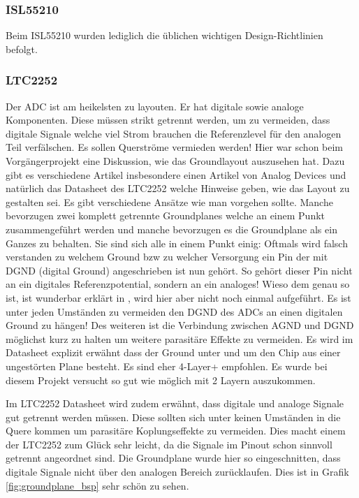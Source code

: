 \subsubsection*{ISL55210}
Beim ISL55210 wurden lediglich die üblichen wichtigen Design-Richtlinien befolgt. 

\subsubsection*{LTC2252}
Der ADC ist am heikelsten zu layouten. Er hat digitale sowie analoge Komponenten. Diese müssen strikt getrennt werden, um zu vermeiden, dass digitale Signale welche viel Strom brauchen die Referenzlevel für den analogen Teil verfälschen. Es sollen Querströme vermieden werden!
Hier war schon beim Vorgängerprojekt eine Diskussion, wie das Groundlayout auszusehen hat. Dazu gibt es verschiedene Artikel insbesondere einen Artikel von Analog Devices \cite{StayingWellGrounded2012} und natürlich das Datasheet des LTC2252\cite{LTC2252} welche Hinweise geben, wie das Layout zu gestalten sei. Es gibt verschiedene Ansätze wie man vorgehen sollte. Manche bevorzugen zwei komplett getrennte Groundplanes welche an einem Punkt zusammengeführt werden und manche bevorzugen es die Groundplane als ein Ganzes zu behalten. Sie sind sich alle in einem Punkt einig: Oftmals wird falsch verstanden zu welchem Ground bzw zu welcher Versorgung ein Pin der mit DGND (digital Ground) angeschrieben ist nun gehört. So gehört dieser Pin nicht an ein digitales Referenzpotential, sondern an ein analoges! Wieso dem genau so ist, ist wunderbar erklärt in \cite{StayingWellGrounded2012}, wird hier aber nicht noch einmal aufgeführt.
Es ist unter jeden Umständen zu vermeiden den DGND des ADCs an einen digitalen Ground zu hängen! Des weiteren ist die Verbindung zwischen AGND und DGND möglichst kurz zu halten um weitere parasitäre Effekte zu vermeiden.
Es wird im Datasheet explizit erwähnt dass der Ground unter und um den Chip aus einer ungestörten Plane besteht. Es sind eher 4-Layer+ empfohlen. Es wurde bei diesem Projekt versucht so gut wie möglich mit 2 Layern auszukommen.

Im LTC2252 Datasheet wird zudem erwähnt, dass digitale und analoge Signale gut getrennt werden müssen. Diese sollten sich unter keinen Umständen in die Quere kommen um parasitäre Koplungseffekte zu vermeiden. Dies macht einem der LTC2252 zum Glück sehr leicht, da die Signale im Pinout schon sinnvoll getrennt angeordnet sind.
Die Groundplane wurde hier so eingeschnitten, dass digitale Signale nicht über den analogen Bereich zurücklaufen. Dies ist in Grafik \ref{fig:groundplane_bsp} sehr schön zu sehen.

